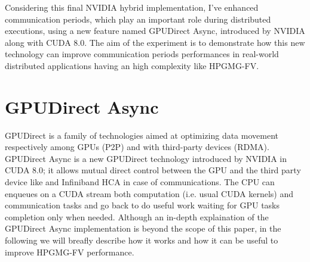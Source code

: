 \documentclass[review]{siamart1116}
\begin{document}

Considering this final NVIDIA hybrid implementation, I've enhanced communication periods, which play an important role during distributed executions, using a new feature named GPUDirect Async, introduced by NVIDIA along with CUDA 8.0.
The aim of the experiment is to demonstrate how this new technology can improve communication periods performances in real-world distributed applications having an high complexity like HPGMG-FV.


\section{GPUDirect Async}\label{sec:gpudirect_async}

GPUDirect \cite{GPUDirect} is a family of technologies aimed at optimizing data movement respectively among GPUs (P2P) and with third-party devices (RDMA). GPUDirect Async is a new GPUDirect technology introduced by NVIDIA in CUDA 8.0; it allows mutual direct control between the GPU and the third party device like and Infiniband HCA in case of communications. The CPU can enqueues on a CUDA stream both computation (i.e. usual CUDA kernels) and communication tasks and go back to do useful work waiting for GPU tasks completion only when needed. Although an in-depth explaination of the GPUDirect Async implementation is beyond the scope of this paper, in the following we will breafly describe how it works and how it can be useful to improve HPGMG-FV performance.\\
\end{document}
